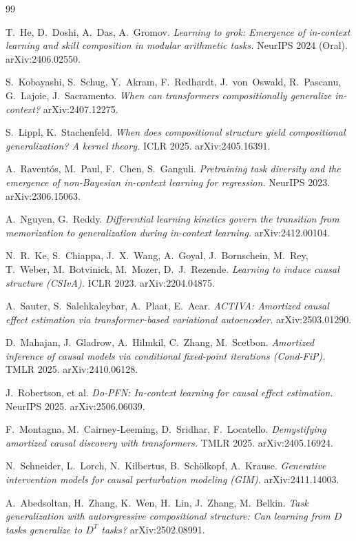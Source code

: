 \documentclass[11pt]{article}
\begin{document}
\begin{thebibliography}{99}
\small\sloppy

 T.~He, D.~Doshi, A.~Das, A.~Gromov.
\emph{Learning to grok: Emergence of in-context learning and skill composition in modular arithmetic tasks.}
NeurIPS 2024 (Oral). arXiv:2406.02550.

 S.~Kobayashi, S.~Schug, Y.~Akram, F.~Redhardt, J.~von~Oswald, R.~Pascanu,
G.~Lajoie, J.~Sacramento.
\emph{When can transformers compositionally generalize in-context?} arXiv:2407.12275.

 S.~Lippl, K.~Stachenfeld.
\emph{When does compositional structure yield compositional generalization? A kernel theory.}
ICLR 2025. arXiv:2405.16391.

 A.~Raventós, M.~Paul, F.~Chen, S.~Ganguli.
\emph{Pretraining task diversity and the emergence of non-Bayesian in-context learning for regression.}
NeurIPS 2023. arXiv:2306.15063.

 A.~Nguyen, G.~Reddy.
\emph{Differential learning kinetics govern the transition from memorization to generalization during
in-context learning.} arXiv:2412.00104.

 N.~R.~Ke, S.~Chiappa, J.~X.~Wang, A.~Goyal, J.~Bornschein, M.~Rey, T.~Weber,
M.~Botvinick, M.~Mozer, D.~J.~Rezende.
\emph{Learning to induce causal structure (CSIvA).} ICLR 2023. arXiv:2204.04875.

 A.~Sauter, S.~Salehkaleybar, A.~Plaat, E.~Acar.
\emph{ACTIVA: Amortized causal effect estimation via transformer-based variational autoencoder.}
arXiv:2503.01290.

 D.~Mahajan, J.~Gladrow, A.~Hilmkil, C.~Zhang, M.~Scetbon.
\emph{Amortized inference of causal models via conditional fixed-point iterations (Cond-FiP).}
TMLR 2025. arXiv:2410.06128.

 J.~Robertson, et al.
\emph{Do-PFN: In-context learning for causal effect estimation.} NeurIPS 2025. arXiv:2506.06039.

 F.~Montagna, M.~Cairney-Leeming, D.~Sridhar, F.~Locatello.
\emph{Demystifying amortized causal discovery with transformers.} TMLR 2025. arXiv:2405.16924.

 N.~Schneider, L.~Lorch, N.~Kilbertus, B.~Schölkopf, A.~Krause.
\emph{Generative intervention models for causal perturbation modeling (GIM).} arXiv:2411.14003.

 A.~Abedsoltan, H.~Zhang, K.~Wen, H.~Lin, J.~Zhang, M.~Belkin.
\emph{Task generalization with autoregressive compositional structure: Can learning from $D$ tasks
generalize to $D^{T}$ tasks?} arXiv:2502.08991.

\end{thebibliography}
\end{document}
